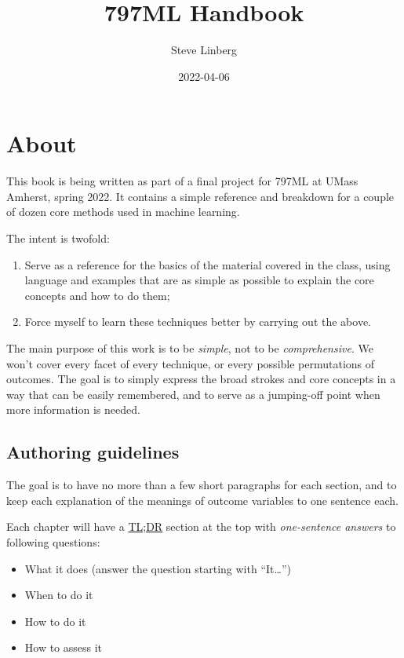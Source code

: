 \documentclass[
]{book}
\title{797ML Handbook}
\author{Steve Linberg}
\date{2022-04-06}
\providecommand{\tightlist}{%
  \setlength{\itemsep}{0pt}\setlength{\parskip}{0pt}}
\begin{document}
\maketitle

{
\setcounter{tocdepth}{1}
\tableofcontents
}
\hypertarget{about}{%
\chapter{About}\label{about}}

This book is being written as part of a final project for 797ML at UMass
Amherst, spring 2022. It contains a simple reference and breakdown for a
couple of dozen core methods used in machine learning.

The intent is twofold:

\begin{enumerate}
\def\labelenumi{\arabic{enumi}.}
\tightlist
\item
  Serve as a reference for the basics of the material covered in the class, using language and examples that are as simple as possible to explain the core concepts and how to do them;
\item
  Force myself to learn these techniques better by carrying out the above.
\end{enumerate}

The main purpose of this work is to be \emph{simple}, not to be \emph{comprehensive}. We won't cover every facet of every technique, or every possible permutations of outcomes. The goal is to simply express the broad strokes and core concepts in a way that can be easily remembered, and to serve as a jumping-off point when more information is needed.

\hypertarget{authoring-guidelines}{%
\section{Authoring guidelines}\label{authoring-guidelines}}

The goal is to have no more than a few short paragraphs for each section, and to keep each explanation of the meanings of outcome variables to one sentence each.

Each chapter will have a \href{https://en.wikipedia.org/wiki/Wikipedia:Too_long;_didn\%27t_read}{TL;DR} section at the top with \emph{one-sentence answers} to following questions:

\begin{itemize}
\tightlist
\item
  What it does (answer the question starting with ``It\ldots{}'')
\item
  When to do it
\item
  How to do it
\item
  How to assess it
\end{itemize}
\end{document}
